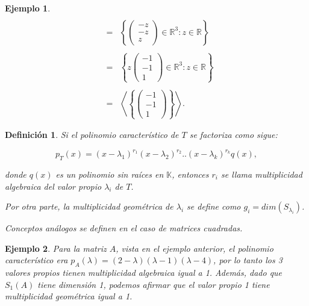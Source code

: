 \documentclass[12pt]{book}
\newtheorem{defi}{Definici\'on}
\newtheorem{ejem}{Ejemplo}
\def\R{\mathbb{R}}
\def\K{\mathbb{K}}
\begin{document}
\begin{ejem}
{\begin{eqnarray*}
\\
&=&\left\{ \left(\begin{array}{r} -z \\ -z \\ z \end{array}\right)\in\R^3: z\in\R\right\}\\
\\
&=&\left\{ z\left(\begin{array}{r} -1  \\ -1 \\ 1  \end{array}\right)\in\R^3: z\in\R\right\}\\
\\
&=&\left\langle\left\{\left(\begin{array}{r} -1  \\ -1 \\ 1 \end{array}\right)\right\}\right\rangle.
\end{eqnarray*}
}
\end{ejem}

\begin{defi}
Si el polinomio característico de $T$ se factoriza como sigue:

$$p_T(x)=(x-\lambda_1)^{r_1}(x-\lambda_2)^{r_2}..(x-\lambda_k)^{r_k}q(x),$$

donde $q(x)$ es un polinomio sin raíces en $\K$, entonces $r_i$ se llama \emph{multiplicidad algebraica del valor propio $\lambda_i$ de $T$}.

Por otra parte, la multiplicidad geométrica de $\lambda_i$ se define como $g_i=dim(S_{\lambda_i})$.

Conceptos análogos se definen en el caso de matrices cuadradas.
\end{defi}

\begin{ejem}{\em 
Para la matriz $A$, vista en el ejemplo anterior, el polinomio característico era $p_A(\lambda)=(2-\lambda)(\lambda-1)(\lambda-4)$, por lo tanto los 3 valores propios tienen multiplicidad algebraica igual a 1.
Además, dado que $S_1(A)$ tiene  dimensión 1, podemos afirmar que el valor propio 1 tiene multiplicidad geométrica igual a 1.}
\end{ejem}
\end{document}
